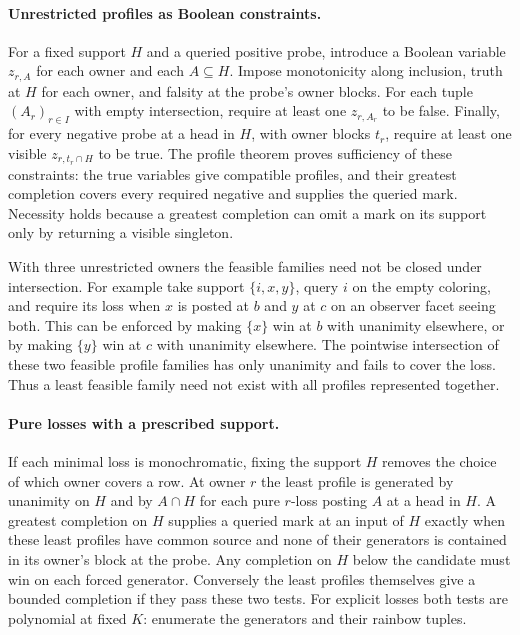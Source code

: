 \paragraph{Unrestricted profiles as Boolean constraints.}
For a fixed support $H$ and a queried positive probe, introduce
a Boolean variable $z_{r,A}$ for each owner and each
$A\subseteq H$. Impose monotonicity along inclusion, truth at
$H$ for each owner, and falsity at the probe's owner blocks.
For each tuple $(A_r)_{r\in I}$ with empty intersection, require
at least one $z_{r,A_r}$ to be false. Finally, for every negative
probe at a head in $H$, with owner blocks $t_r$, require
at least one visible $z_{r,t_r\cap H}$ to be true.
The profile theorem proves sufficiency of these constraints:
the true variables give compatible profiles, and their greatest
completion covers every required negative and supplies
the queried mark. Necessity holds because a greatest completion
can omit a mark on its support only by returning a visible
singleton.

With three unrestricted owners the feasible families need
not be closed under intersection. For example take support
$\{i,x,y\}$, query $i$ on the empty coloring, and require its loss
when $x$ is posted at $b$ and $y$ at $c$ on an observer
facet seeing both. This can be enforced by making $\{x\}$
win at $b$ with unanimity elsewhere, or by making $\{y\}$
win at $c$ with unanimity elsewhere. The pointwise
intersection of these two feasible profile families has only
unanimity and fails to cover the loss. Thus a least feasible
family need not exist with all profiles represented together.

\paragraph{Pure losses with a prescribed support.}
If each minimal loss is monochromatic, fixing the support
$H$ removes the choice of which owner covers a row.
At owner $r$ the least profile is generated by unanimity
on $H$ and by $A\cap H$ for each pure $r$-loss posting
$A$ at a head in $H$. A greatest completion on $H$ supplies
a queried mark at an input of $H$ exactly when these least
profiles have common source and none of their generators
is contained in its owner's block at the probe. Any completion
on $H$ below the candidate must win on each forced generator.
Conversely the least profiles themselves give a bounded
completion if they pass these two tests.
For explicit losses both tests are polynomial at fixed $K$:
enumerate the generators and their rainbow tuples.

